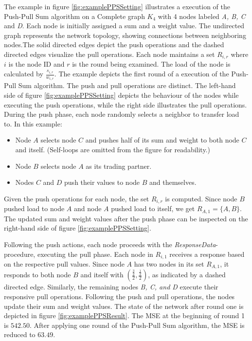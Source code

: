 The example in figure \ref{fig:examplePPSSetting} illustrates a execution of the Push-Pull Sum algorithm on a Complete graph $K_4$ with 4 nodes labeled \textit{A, B, C} and \textit{D}. Each node is initially assigned a sum and a weight value. The undirected graph represents the network topology, showing connections between neighboring nodes.The solid directed edges depict the push operations and the dashed directed edges visualize the pull operations. Each node maintains a set $R_{i,r}$ where $i$ is the node ID and $r$ is the round being examined. The load of the node is calculated by $\frac{s_{i,r}}{w_{i,r}}$. The example depicts the first round of a execution of the Push-Pull Sum algorithm. The push and pull operations are distinct. The left-hand side of figure \ref{fig:examplePPSSetting} depicts the behaviour of the nodes while executing the push operations, while the right side illustrates the pull operations. During the push phase, each node randomly selects a neighbor to transfer load to. In this example:

\begin{itemize}
    \item Node $A$ selects node $C$ and pushes half of its sum and weight to both node $C$ and itself. (Self-loops are omitted from the figure for readability.)
    \item Node $B$ selects node $A$ as its trading partner.
    \item Nodes $C$ and $D$ push their values to node $B$ and themselves.
\end{itemize}

Given the push operations for each node, the set $R_{i,r}$ is computed. Since node $B$ pushed load to node $A$ and node $A$ pushed load to itself, we get $R_{A,1}=\{A,B\}$. The updated sum and weight values after the push phase can be inspected on the right-hand side of figure \ref{fig:examplePPSSetting}.

Following the push actions, each node proceeds with the \textit{ResponseData}-procedure, executing the pull phase. Each node in $R_{i,1}$ receives a response based on the respective pull values. Since node $A$ has two nodes in its set $R_{A,1}$, it responds to both node $B$ and itself with $\left(\frac{\frac{3}{2}}{2}, \frac{\frac{1}{2}}{2}\right)$, as indicated by a dashed directed edge. Similarly, the remaining nodes \textit{B, C, and D} execute their responsive pull operations. Following the push and pull operations, the nodes update their sum and weight values. The state of the network after round one is depicted in figure \ref{fig:examplePPSResult}. The MSE at the beginning of round 1 is $542.50$. After applying one round of the Push-Pull Sum algorithm, the MSE is reduced to $63.49$.

